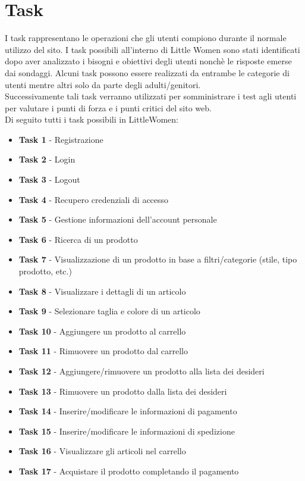 \documentclass[12pt,a4paper]{report}
\begin{document}
\section{Task}
I task rappresentano le operazioni che gli utenti compiono durante il normale utilizzo del sito. I task possibili all'interno di Little Women sono stati identificati dopo aver analizzato i bisogni e obiettivi degli utenti nonchè le risposte emerse dai sondaggi. Alcuni task possono essere realizzati da entrambe le categorie di utenti mentre altri solo da parte degli adulti/genitori. \\
Successivamente tali task verranno utilizzati per somministrare i test agli utenti per valutare i punti di forza e i punti critici del sito web.\\
Di seguito tutti i task possibili in LittleWomen:
\begin{itemize}
  \item \textbf{Task 1} - Registrazione
  \item \textbf{Task 2} - Login
  \item \textbf{Task 3} - Logout
  \item \textbf{Task 4} - Recupero credenziali di accesso
  \item \textbf{Task 5} - Gestione informazioni dell'account personale
  \item \textbf{Task 6} - Ricerca di un prodotto
  \item \textbf{Task 7} - Visualizzazione di un prodotto in base a filtri/categorie (stile, tipo prodotto, etc.)
  \item \textbf{Task 8} - Visualizzare i dettagli di un articolo
  \item \textbf{Task 9} - Selezionare taglia e colore di un articolo
  \item \textbf{Task 10} - Aggiungere un prodotto al carrello
  \item \textbf{Task 11} - Rimuovere un prodotto dal carrello
  \item \textbf{Task 12} - Aggiungere/rimuovere un prodotto alla lista dei desideri
  \item \textbf{Task 13} - Rimuovere un prodotto dalla lista dei desideri
  \item \textbf{Task 14} - Inserire/modificare le informazioni di pagamento
  \item \textbf{Task 15} - Inserire/modificare le informazioni di spedizione
  \item \textbf{Task 16} - Visualizzare gli articoli nel carrello
  \item \textbf{Task 17} - Acquistare il prodotto completando il pagamento

\end{itemize}
\end{document}
